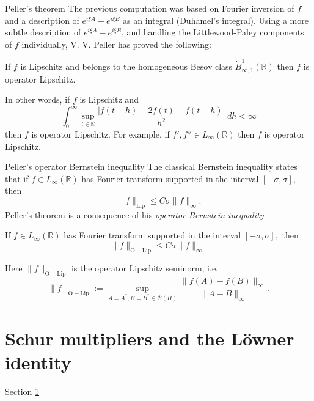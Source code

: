 \documentclass{beamer}
\numberwithin{equation}{section}
\theoremstyle{plain}
\theoremstyle{plain}
\theoremstyle{definition}
\theoremstyle{plain}
\theoremstyle{plain}
\theoremstyle{definition}
\newcommand{\Rl}{\mathbb{R}}
\newcommand{\Bc}{\mathcal{B}}
\begin{document}
\begin{frame}{Peller's theorem}
    The previous computation was based on Fourier inversion of $f$ and a description of $e^{i\xi A}-e^{i\xi B}$ as an integral (Duhamel's integral).
    \pause
    Using a more subtle description of $e^{i\xi A}-e^{i\xi B}$, and handling the Littlewood-Paley components of $f$
    individually, V. V. Peller has proved the following:
    \begin{theorem}[Peller (1990)]
        If $f$ is Lipschitz and belongs to the homogeneous Besov class $\dot{B}^1_{\infty,1}(\Rl)$ then $f$ is operator Lipschitz.
    \end{theorem}
    \pause
    In other words, if $f$ is Lipschitz and
    \begin{equation*}
        \int_0^\infty \sup_{t\in \Rl} \frac{|f(t-h)-2f(t)+f(t+h)|}{h^2} \,dh < \infty
    \end{equation*}
    then $f$ is operator Lipschitz. 
    \pause
    For example, if $f',f'' \in L_{\infty}(\Rl)$ then $f$ is operator Lipschitz.
\end{frame}

\begin{frame}{Peller's operator Bernstein inequality}
    The classical Bernstein inequality states that if $f \in L_{\infty}(\Rl)$ has Fourier transform supported in the interval $[-\sigma,\sigma],$ then
    \[
        \|f\|_{\mathrm{Lip}} \leq C\sigma \|f\|_{\infty}.
    \]\pause
    Peller's theorem is a consequence of his \emph{operator Bernstein inequality}.
    \begin{theorem}[Peller (1990)]
        If $f \in L_{\infty}(\Rl)$ has Fourier transform supported in the interval $[-\sigma,\sigma],$ then
        \[
            \|f\|_{\mathrm{O-Lip}} \leq C\sigma\|f\|_\infty.
        \]
    \end{theorem}
    Here $\|f\|_{\mathrm{O-Lip}}$ is the operator Lipschitz seminorm, i.e.
    \[
        \|f\|_{\mathrm{O-Lip}} := \sup_{A=A^*,B=B^*\in \Bc(H)} \frac{\|f(A)-f(B)\|_{\infty}}{\|A-B\|_{\infty}}.
    \]
\end{frame}

\section{Schur multipliers and the L\"owner identity}\label{section_schur}

\begin{frame}
    \Huge{Section \ref{section_schur}}
\end{frame}
\end{document}
